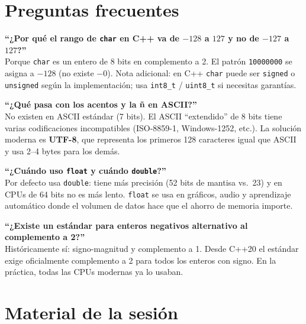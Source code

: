 \documentclass[12pt, oneside]{article}
\begin{document}
\section{Preguntas frecuentes}

\begin{notaprofesor}[FAQ]

\textbf{``¿Por qué el rango de \texttt{char} en C++ va de $-128$ a $127$
y no de $-127$ a $127$?''}\\
Porque \texttt{char} es un entero de 8 bits en complemento a 2.
El patrón \texttt{10000000} se asigna a $-128$ (no existe $-0$).
Nota adicional: en C++ \texttt{char} puede ser \texttt{signed} o
\texttt{unsigned} según la implementación; usa \texttt{int8\_t} /
\texttt{uint8\_t} si necesitas garantías.

\vspace{0.6em}
\textbf{``¿Qué pasa con los acentos y la ñ en ASCII?''}\\
No existen en ASCII estándar (7 bits). El ASCII ``extendido'' de 8 bits
tiene varias codificaciones incompatibles (ISO-8859-1, Windows-1252, etc.).
La solución moderna es \textbf{UTF-8}, que representa los primeros 128
caracteres igual que ASCII y usa 2–4 bytes para los demás.

\vspace{0.6em}
\textbf{``¿Cuándo uso \texttt{float} y cuándo \texttt{double}?''}\\
Por defecto usa \texttt{double}: tiene más precisión (52 bits de mantisa
vs.\ 23) y en CPUs de 64 bits no es más lento. \texttt{float} se usa
en gráficos, audio y aprendizaje automático donde el volumen de datos
hace que el ahorro de memoria importe.

\vspace{0.6em}
\textbf{``¿Existe un estándar para enteros negativos alternativo al
complemento a 2?''}\\
Históricamente sí: signo-magnitud y complemento a 1. Desde C++20
el estándar exige oficialmente complemento a 2 para todos los
enteros con signo. En la práctica, todas las CPUs modernas ya lo usaban.

\end{notaprofesor}

\section{Material de la sesión}
\end{document}
